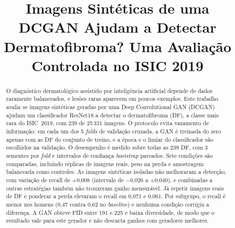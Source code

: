 \documentclass[conference]{IEEEtran}
\newcommand{\pl}{\ensuremath{+}}
\newcommand{\mn}{\ensuremath{-}}
\begin{document}
\title{Imagens Sintéticas de uma DCGAN Ajudam a Detectar Dermatofibroma? Uma Avaliação Controlada no ISIC 2019}

\author{
\and
{}
}

\maketitle

\begin{abstract}
O diagnóstico dermatológico assistido por inteligência artificial depende de dados raramente balanceados, e lesões raras aparecem em poucos exemplos. Este trabalho avalia se imagens sintéticas geradas por uma Deep Convolutional GAN (DCGAN) ajudam um classificador ResNet18 a detectar o dermatofibroma (DF), a classe mais rara do ISIC~2019, com 239 de 25\,331 imagens. O protocolo evita vazamento de informação: em cada um dos 5 \textit{folds} de validação cruzada, a GAN é treinada do zero apenas com as DF do conjunto de treino, e a época e o limiar do classificador são escolhidos na validação. O desempenho é medido sobre todas as 239 DF, com 3 sementes por \textit{fold} e intervalos de confiança \textit{bootstrap} pareados. Sete condições são comparadas, incluindo réplicas de imagens reais, peso na perda e amostragem balanceada como controles. As imagens sintéticas isoladas não melhoraram a detecção, com variação de recall de \pl0,008 (intervalo de \mn0,026 a \pl0,040), e combinadas a outras estratégias também não trouxeram ganho mensurável. Já repetir imagens reais de DF e ponderar a perda elevaram o recall em 0,071 e 0,061. Por subgrupo, o recall é menor nos homens (0,47 contra 0,62 no \textit{baseline}) e nenhuma condição corrigiu a diferença. A GAN obteve FID entre 191 e 225 e baixa diversidade, de modo que o resultado vale para este gerador e não descarta ganhos com geradores melhores.
\end{abstract}
\end{document}
